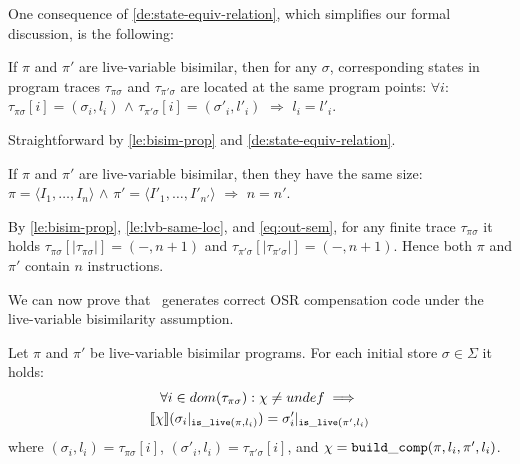 \noindent One consequence of \ref{de:state-equiv-relation}, which simplifies our formal discussion, is the following:

\begin{lemma}
\label{le:lvb-same-loc}
If $\pi$ and $\pi'$ are live-variable bisimilar, then for any $\sigma$, corresponding states in program traces $\tau_{\pi\sigma}$ and $\tau_{\pi'\sigma}$ are located at the same program points: $\forall i:$ $\tau_{\pi\sigma}[i]=(\sigma_i, l_i)$ $\wedge$ $\tau_{\pi'\sigma}[i]=(\sigma'_i, l'_i)$ $\Longrightarrow$ $l_i=l'_i$.
\end{lemma}
\begin{myproof}
Straightforward by \ref{le:bisim-prop} and \ref{de:state-equiv-relation}.
\end{myproof}

\begin{corollary}
If $\pi$ and $\pi'$ are live-variable bisimilar, then they have the same size: $\pi=\langle I_1,\ldots,I_n\rangle$ $\wedge$ $\pi'=\langle I'_1,\ldots,I'_{n'}\rangle$ $\Longrightarrow$ $n=n'$. 
\end{corollary}
\begin{myproof}
By \ref{le:bisim-prop}, \ref{le:lvb-same-loc}, and \eqref{eq:out-sem}, for any finite trace $\tau_{\pi\sigma}$ it holds $\tau_{\pi\sigma}[|\tau_{\pi\sigma}|]=(-,n+1)$ and $\tau_{\pi'\sigma}[|\tau_{\pi'\sigma}|]=(-,n+1)$. Hence both $\pi$ and $\pi'$ contain $n$ instructions.
\end{myproof}

\noindent We can now prove that \buildcomp\ generates correct OSR compensation code under the live-variable bisimilarity assumption. 

\begin{lemma}
\label{le:build-comp-corr}
Let $\pi$ and $\pi'$ be live-variable bisimilar programs. For each initial store $\sigma\in \Sigma$ it holds:
\begin{gather*}
\forall i\in dom(\tau_{\pi\sigma}): \chi\neq undef \implies \\
\mysem{\chi}(\sigma_i\vert_{\live(\pi,l_i)}) = \sigma'_i\vert_{\live(\pi',l_i)}
\end{gather*}
where $(\sigma_i,l_i)=\tau_{\pi\sigma}[i]$, $(\sigma'_i,l_i)=\tau_{\pi'\sigma}[i]$, and $\chi={\tt build\_comp}(\pi,l_i,\pi',l_i)$.
\end{lemma}

